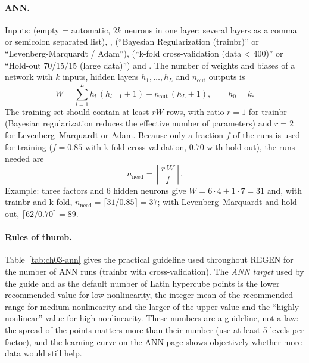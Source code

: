 \paragraph{ANN.} Inputs:  (empty = automatic, $2k$ neurons in one layer; several
layers as a comma or semicolon separated list), ,  (``Bayesian Regularization
(trainbr)'' or ``Levenberg-Marquardt / Adam''),  (``k-fold cross-validation (data < 400)'' or
``Hold-out 70/15/15 (large data)'') and . The number of weights and biases of a network with
$k$ inputs, hidden layers $h_1, \dots, h_L$ and $n_{\text{out}}$ outputs is
\begin{equation}
W = \sum_{l=1}^{L} h_l\,(h_{l-1} + 1) + n_{\text{out}}\,(h_L + 1), \qquad h_0 = k .
\label{eq:ch03-weights}
\end{equation}
The training set should contain at least $rW$ rows, with ratio $r = 1$ for trainbr (Bayesian regularization reduces
the effective number of parameters) and $r = 2$ for Levenberg--Marquardt or Adam. Because only a fraction $f$ of the
runs is used for training ($f = 0.85$ with k-fold cross-validation, $0.70$ with hold-out), the runs needed are
\begin{equation}
n_{\text{need}} = \left\lceil \frac{r\,W}{f} \right\rceil .
\label{eq:ch03-annruns}
\end{equation}
Example: three factors and 6 hidden neurons give $W = 6 \cdot 4 + 1 \cdot 7 = 31$ and, with trainbr and k-fold,
$n_{\text{need}} = \lceil 31/0.85 \rceil = 37$; with Levenberg--Marquardt and hold-out, $\lceil 62/0.70 \rceil = 89$.

\paragraph{Rules of thumb.} Table~\ref{tab:ch03-ann} gives the practical guideline used throughout REGEN for the
number of ANN runs (trainbr with cross-validation). The \emph{ANN target} used by the guide and as the default
number of Latin hypercube points is the lower recommended value for low nonlinearity, the integer mean of the
recommended range for medium nonlinearity and the larger of the upper value and the ``highly nonlinear'' value for
high nonlinearity. These numbers are a guideline, not a law: the spread of the points matters more than their
number (use at least 5 levels per factor), and the learning curve on the ANN page shows objectively whether more data
would still help.

